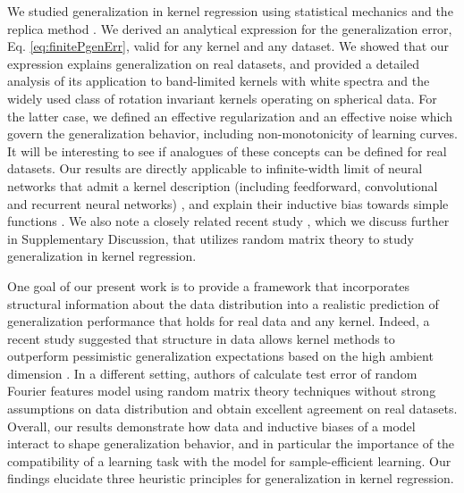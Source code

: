 \documentclass[11pt]{article}
\begin{document}
We studied generalization in kernel regression using statistical mechanics and the replica method \cite{mezard1987spin}. We derived an analytical expression for the generalization error, Eq. \eqref{eq:finitePgenErr}, valid for any kernel and any dataset. We showed that our expression explains generalization on real datasets, and provided a detailed analysis of its application to band-limited kernels with white spectra and the widely used class of rotation invariant kernels \cite{genton2001classes,RasmussenWilliams} operating on spherical data. For the latter case, we defined an effective regularization and an effective noise which govern the generalization behavior, including non-monotonicity of learning curves. It will be interesting to see if analogues of these concepts can be defined for real datasets. Our results are directly applicable to infinite-width limit of neural networks that admit a kernel description (including feedforward, convolutional and recurrent neural networks) \cite{jacot2018neural, neuraltangents2020, alemohammad2020recurrent, arora2019exact, yang2019tensor1, yang2020tensor2}, and explain their inductive bias towards simple functions \cite{neyshabur_inductivebias, lee2019wide, jacot2020implicit, chizat2020implicit, bietti2019inductive, ghorbani_twolayer, soudry_implicitbias}. We also note a closely related recent study  \cite{jacot2020kernel}, which we discuss further in Supplementary Discussion, that utilizes random matrix theory to study generalization in kernel regression.


One goal of our present work is to provide a framework that incorporates structural information about the data distribution into a realistic prediction of generalization performance that holds for real data and any kernel.  Indeed, a recent study suggested that structure in data allows kernel methods to outperform pessimistic generalization expectations based on the high ambient dimension \cite{spigler2020asymptotic}. In a different setting, authors of \cite{liao2020random} calculate test error of random Fourier features model using random matrix theory techniques without strong assumptions on data distribution and obtain excellent agreement on real datasets. Overall, our results demonstrate how data and inductive biases of a model interact to shape generalization behavior, and in particular the importance of the compatibility of a learning task with the model for sample-efficient learning. Our findings elucidate three heuristic principles for generalization in kernel regression. 
\end{document}
